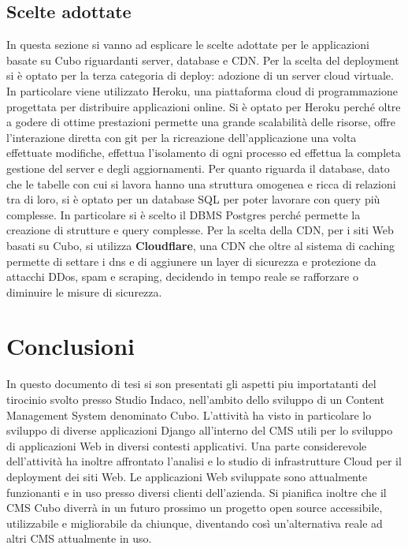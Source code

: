 \documentclass[12pt,a4paper]{article}
\begin{document}
\subsection{Scelte adottate}
In questa sezione si vanno ad esplicare le scelte adottate per le applicazioni basate su Cubo riguardanti server, database e CDN. Per la scelta del deployment si è optato per la terza categoria di deploy: adozione di un server cloud virtuale. In particolare viene utilizzato Heroku, una piattaforma cloud di programmazione progettata per distribuire applicazioni online.
Si è optato per Heroku perché oltre a godere di ottime prestazioni permette una grande scalabilità delle risorse, offre l'interazione diretta con git per la ricreazione dell'applicazione una volta effettuate modifiche, effettua l'isolamento di ogni processo ed effettua la completa gestione del server e degli aggiornamenti.
Per quanto riguarda il database, dato che le tabelle con cui si lavora hanno una struttura omogenea e ricca di relazioni tra di loro, si è optato per un database SQL per poter lavorare con query più complesse. In particolare si è scelto il DBMS Postgres perché permette la creazione di strutture e query complesse.
Per la scelta della CDN, per i siti Web basati su Cubo, si utilizza \textbf{Cloudflare}, una CDN che oltre al sistema di caching permette di settare i dns e di aggiunere un layer di sicurezza e protezione da attacchi DDos, spam e scraping, decidendo in tempo reale se rafforzare o diminuire le misure di sicurezza.


\clearpage

\clearpage
\section{Conclusioni}
\label{conclusioni}
In questo documento di tesi si son presentati gli aspetti piu importatanti del tirocinio svolto presso Studio Indaco, nell'ambito dello sviluppo di un Content Management System denominato Cubo.
L'attività ha visto in particolare lo sviluppo di diverse applicazioni Django all'interno del CMS utili per lo sviluppo di applicazioni Web in diversi contesti applicativi.
Una parte considerevole dell'attività ha inoltre affrontato l'analisi e lo studio di infrastrutture Cloud per il deployment dei siti Web.
Le applicazioni Web sviluppate sono attualmente funzionanti e in uso presso diversi clienti dell'azienda.
Si pianifica inoltre che il CMS Cubo diverrà in un futuro prossimo un progetto open source accessibile, utilizzabile e migliorabile da chiunque, diventando così un'alternativa reale ad altri CMS attualmente in uso.
\end{document}
